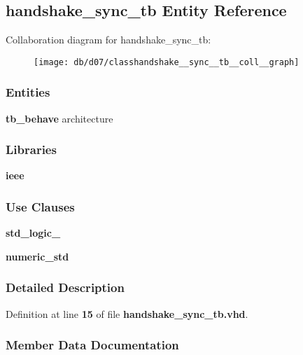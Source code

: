 \subsection{handshake\+\_\+sync\+\_\+tb Entity Reference}
\label{classhandshake__sync__tb}


Collaboration diagram for handshake\+\_\+sync\+\_\+tb\+:\nopagebreak
\begin{figure}[H]
\begin{center}
\leavevmode
\texttt{[image: db/d07/classhandshake\_\_sync\_\_tb\_\_coll\_\_graph]}
\end{center}
\end{figure}
\subsubsection*{Entities}
\begin{DoxyCompactItemize}
\item 
{\bf tb\+\_\+behave} architecture
\end{DoxyCompactItemize}
\subsubsection*{Libraries}
 \begin{DoxyCompactItemize}
\item 
{\bf ieee} 
\end{DoxyCompactItemize}
\subsubsection*{Use Clauses}
 \begin{DoxyCompactItemize}
\item 
{\bf std\+\_\+logic\+\_}   
\item 
{\bf numeric\+\_\+std}   
\end{DoxyCompactItemize}


\subsubsection{Detailed Description}


Definition at line {\bf 15} of file {\bf handshake\+\_\+sync\+\_\+tb.\+vhd}.



\subsubsection{Member Data Documentation}
